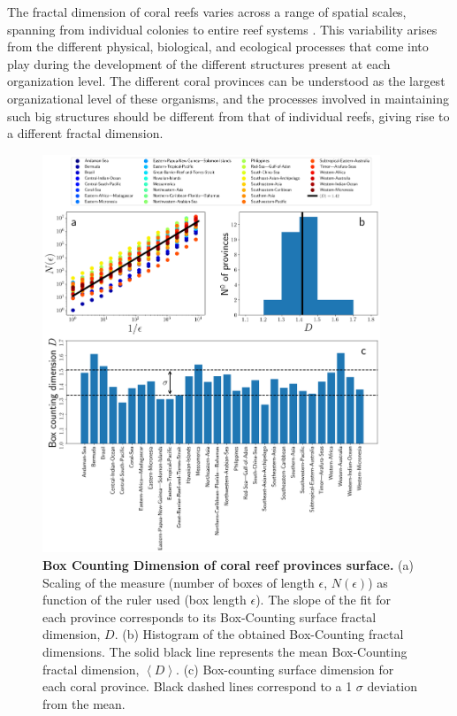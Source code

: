 The fractal dimension of coral reefs varies across a range of spatial
scales, spanning from individual colonies to entire reef systems
\cite{George2021}. This variability arises from the different physical,
biological, and ecological processes that come into play during the development
of the different structures present at each organization level. The different
coral provinces can be understood as the largest organizational level of these
organisms, and the processes involved in maintaining such big structures should
be different from that of individual reefs, giving rise to a different fractal
dimension.

\begin{figure}[H]
    \centering
    \includegraphics[width=0.9\textwidth]{Figures/Box_Counting_Dimensions.pdf}
    \caption[Box Counting Dimension of coral reef provinces
        surface]{\textbf{Box
            Counting Dimension of coral reef provinces surface.} (a)
        Scaling of the measure (number of boxes of length $\epsilon$,
        $N(\epsilon)$) as
        function of the ruler used (box length $\epsilon$). The slope of the
        fit for
        each province corresponds to its Box-Counting surface fractal
        dimension, $D$.
        (b) Histogram of the obtained Box-Counting fractal dimensions. The
        solid black
        line represents the mean Box-Counting fractal dimension,
        $\left<D\right>$. (c)
        Box-counting surface dimension for each coral province. Black dashed
        lines
        correspond to a 1 $\sigma$ deviation from the mean.}
    \label{fig:Box_Counting_Dimension}
\end{figure}

